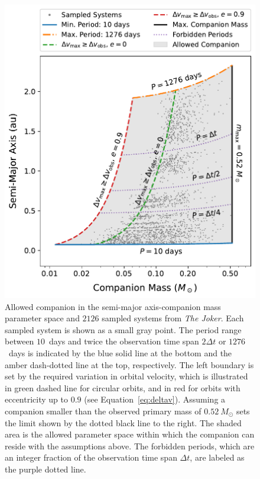 \documentclass[12pt]{ucsddissertation}
\begin{document}
\begin{CJK*}{UTF8}{gbsn}
\begin{figure}[htb!]
    \centering
    \includegraphics[width=0.7\linewidth]{figures/chapter1/Parenago1837-Allowed_Param.pdf}
    \caption[Orbital parameter space constraint of the companion of Parenago 1837]{Allowed companion in the semi-major axis-companion mass parameter space and $2126$ sampled systems from \textit{The Joker}. Each sampled system is shown as a small gray point. The period range between $10$~days and twice the observation time span $2\Delta t$ or $1276$~days is indicated by the blue solid line at the bottom and the amber dash-dotted line at the top, respectively. The left boundary is set by the required variation in orbital velocity, which is illustrated in green dashed line for circular orbits, and in red for orbits with eccentricity up to $0.9$ (see Equation~\ref{eq:deltav}). Assuming a companion smaller than the observed primary mass of $0.52~M_\odot$ sets the limit shown by the dotted black line to the right. The shaded area is the allowed parameter space within which the companion can reside with the assumptions above. The forbidden periods, which are an integer fraction of the observation time span $\Delta t$, are labeled as the purple dotted line.}
    \label{fig:allowed param}
\end{figure}


\end{CJK*}
\end{document}
